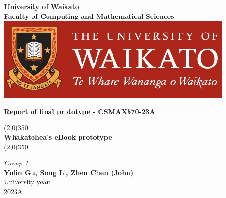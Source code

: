 \begin{titlepage}
  \begin{center}
  \thispagestyle{emptyt}
  \textbf{\Large University of Waikato\\[0.07cm]Faculty of Computing and Mathematical Sciences }\\ [0.3cm]
  
  \includegraphics[scale=0.2]{./Images/UoW.jpg}~\\
  
  \vspace{2cm}
  
  \textbf{\Large Report of final prototype - CSMAX570-23A}\\[0.2cm]
  
  \vspace{0.4cm}
  \hspace{0.3cm}
  
  \begin{center}
  \line(2,0){350}\\
  \vspace*{0.5cm} \textbf{{\LARGE{Whakatōhea's eBook prototype}}}\\
  \vspace*{0.5cm}\line(2,0){350}\\
  \end{center}
  
  \hspace{0.7cm}
    
   \large \emph{Group 1:}\\[0.5cm]
  \textbf{\Large{Yulin Gu, Song Li, Zhen Chen (John)}} \\[0.5cm]
  
   
  
  \vfill
  {\large University year:}\\
  {\large 2023A}
  
  
  \end{center}
  \end{titlepage}
  